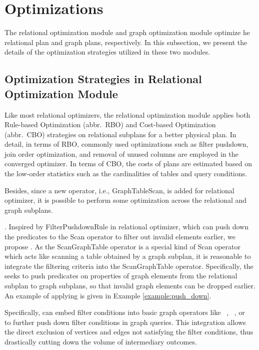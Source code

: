 \section{Optimizations}
\label{sec:optimizations}

The relational optimization module and graph optimization module optimize he relational plan and graph plans, respectively.
In this subsection, we present the details of the optimization strategies utilized in these two modules. 

\subsection{Optimization Strategies in Relational Optimization Module}

Like most relational optimizers, the relational optimization module applies both Rule-based Optimization (abbr.~RBO) and Cost-based Optimization (abbr.~CBO) strategies on relational subplans for a better physical plan.
In detail, in terms of RBO, commonly used optimizations such as filter pushdown, join order optimization, and removal of unused columns are employed in the converged optimizer.
In terms of CBO, the costs of plans are estimated based on the low-order statistics such as the cardinalities of tables and query conditions.

Besides, since a new operator, i.e., GraphTableScan, is added for relational optimizer, it is possible to perform some optimization across the relational and graph subplans.

\filterrule. 
Inspired by FilterPushdownRule in relational optimizer, which can push down the predicates to the Scan operator to filter out invalid elements earlier, we propose \filterrule.
As the ScanGraphTable operator is a special kind of Scan operator which acts like scanning a table obtained by a graph subplan, it is reasonable to integrate the filtering criteria into the ScanGraphTable operator.
Specifically, the \filterrule seeks to push predicates on properties of graph elements from the relational subplan to graph subplans, so that invalid graph elements can be dropped earlier.
An example of applying \filterrule is given in Example \ref{example:push_down}.

Specifically, \filterrule can embed filter conditions into basic graph operators like \scan~, \expandedge~, or \getvertex~ to further push down filter conditions in graph queries. 
This integration allows the direct exclusion of vertices and edges not satisfying the filter conditions, thus drastically cutting down the volume of intermediary outcomes.


